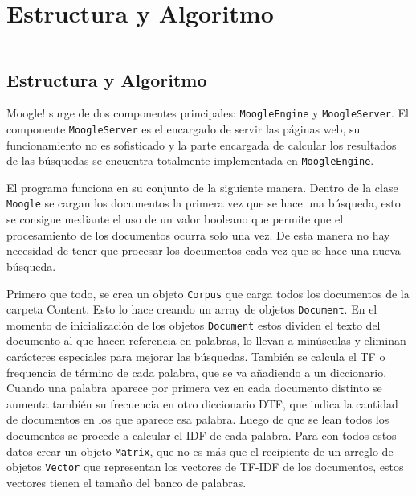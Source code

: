 \section{Estructura y Algoritmo}

\begin{frame}
    \begin{columns}[t]
        \begin{column}{.5\textwidth}
          \tableofcontents[sections={1-2},currentsection]
        \end{column}
        \begin{column}{.5\textwidth}
          \tableofcontents[sections={3-4},currentsection]
        \end{column}
    \end{columns}
\end{frame}

\subsection{Estructura y Algoritmo}
\begin{frame}[fragile]
Moogle! surge de dos componentes principales: \texttt{MoogleEngine} y \texttt{MoogleServer}.
\newline El componente \texttt{MoogleServer} es el encargado de servir las páginas web, su funcionamiento no es sofisticado
y la parte encargada de calcular los resultados de las búsquedas se encuentra totalmente implementada en \texttt{MoogleEngine}.
\end{frame}

\begin{frame}[fragile]
El programa funciona en su conjunto de la siguiente manera.
Dentro de la clase \texttt{Moogle} se cargan los documentos la primera vez que se hace una búsqueda,
esto se consigue mediante el uso de un valor booleano que permite que el 
procesamiento de los documentos ocurra solo una vez. De esta 
manera no hay necesidad de tener que procesar los documentos cada 
vez que se hace una nueva búsqueda.
\end{frame}

\begin{frame}[fragile]
Primero que todo, se crea un objeto \texttt{Corpus} que carga todos los 
documentos de la carpeta Content. Esto lo hace creando un array de objetos \texttt{Document}. En
el momento de inicialización de los objetos \texttt{Document} estos 
dividen el texto del documento al que hacen referencia en 
palabras, lo llevan a minúsculas y eliminan carácteres especiales para mejorar las búsquedas.
También se calcula el TF o frequencia de término de cada 
palabra, que se va añadiendo a un diccionario. Cuando una 
palabra aparece por primera vez en cada documento distinto se 
aumenta también su frecuencia en otro diccionario DTF, que 
indica la cantidad de documentos en los que aparece esa palabra.
Luego de que se lean todos los documentos se procede a calcular 
el IDF de cada palabra. Para con todos estos datos crear un objeto
\texttt{Matrix}, que no es más que el recipiente de un arreglo de objetos 
\texttt{Vector} que representan los vectores de TF-IDF de los 
documentos, estos vectores tienen el tamaño del banco de 
palabras.
\end{frame}

